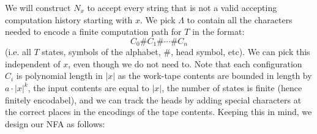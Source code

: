 \documentclass[12pt]{article}
\begin{document}
\begin{solution}
    We will construct $N_x$ to accept every string that is not a valid accepting computation history starting with $x$. We pick $\Lambda$ to contain all the characters needed to encode a finite computation path for $T$ in the format: 
    \[ C_0 \# C_1 \# \cdots \# C_n \]
    (i.e. all $T$ states, symbols of the alphabet, \#, head symbol, etc). We can pick this independent of $x$, even though we do not need to. \bbni
    Note that each configuration $C_i$ is polynomial length in $|x|$ as the work-tape contents are bounded in length by $a \cdot |x|^k$, the input contents are equal to $|x|$, the number of states is finite (hence finitely encodabel), and we can track the heads by adding special characters at the correct places in the encodings of the tape contents. Keeping this in mind, we design our NFA as follows: \bbni


\end{solution}
\end{document}
